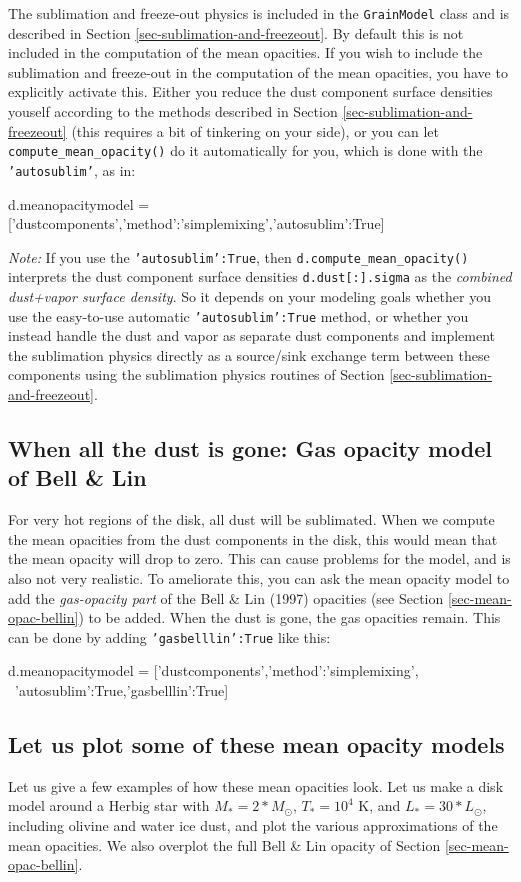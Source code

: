 \documentclass{book}
\newcommand{\code}[1]{{\small\tt #1}}
\begin{document}
The sublimation and freeze-out physics is included in the \code{GrainModel}
class and is described in Section \ref{sec-sublimation-and-freezeout}.  By
default this is not included in the computation of the mean opacities.  If you
wish to include the sublimation and freeze-out in the computation of the mean
opacities, you have to explicitly activate this. Either you reduce the dust
component surface densities youself according to the methods described in
Section \ref{sec-sublimation-and-freezeout} (this requires a bit of
tinkering on your side), or you can let \code{compute\_mean\_opacity()} do
it automatically for you, which is done with the \code{'autosublim'}, as in:
\begin{codebox}
d.meanopacitymodel = ['dustcomponents',{'method':'simplemixing','autosublim':True}]
\end{codebox}
{\em Note:} If you use the \code{'autosublim':True}, then
\code{d.compute\_mean\_opacity()} interprets the dust component surface
densities \code{d.dust[:].sigma} as the {\em combined dust+vapor surface
  density}. So it depends on your modeling goals whether you use the easy-to-use
automatic \code{'autosublim':True} method, or whether you instead handle the
dust and vapor as separate dust components and implement the sublimation physics
directly as a source/sink exchange term between these components using the
sublimation physics routines of Section \ref{sec-sublimation-and-freezeout}.

\subsection{When all the dust is gone: Gas opacity model of Bell \& Lin}
For very hot regions of the disk, all dust will be sublimated. When we
compute the mean opacities from the dust components in the disk, this
would mean that the mean opacity will drop to zero. This can cause
problems for the model, and is also not very realistic. To ameliorate
this, you can ask the mean opacity model to add the {\em gas-opacity part}
of the Bell \& Lin (1997) opacities (see Section \ref{sec-mean-opac-bellin})
to be added. When the dust is gone, the gas opacities remain. This can
be done by adding \code{'gasbelllin':True} like this:
\begin{codebox}
d.meanopacitymodel = ['dustcomponents',{'method':'simplemixing', \
                      'autosublim':True,'gasbelllin':True}]
\end{codebox}

\subsection{Let us plot some of these mean opacity models}\label{sec-opacity-models}
Let us give a few examples of how these mean opacities look. Let us make a disk
model around a Herbig star with $M_{*}=2*M_{\odot}$, $T_{*}=10^4$ K, and
$L_{*}=30*L_{\odot}$, including olivine and water ice dust, and plot the various
approximations of the mean opacities. We also overplot the full Bell \& Lin
opacity of Section \ref{sec-mean-opac-bellin}.
\end{document}
